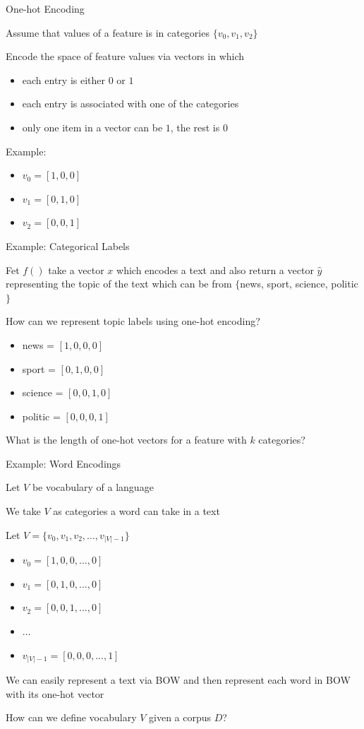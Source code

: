 \documentclass[12pt, handout]{beamer}
\begin{document}
\begin{frame}{One-hot Encoding}  

Assume that values of a feature is in categories $\{ v_0, v_1, v_2 \}$

Encode the space of feature values via vectors in which 

		\begin{itemize}
			\item each entry is either $0$ or $1$
			\item each entry is associated with one of the categories
			\item only one item in a vector can be $1$, the rest is $0$
		\end{itemize}

Example:
		\begin{itemize}
			\item $v_0 = [1, 0, 0]$
			\item $v_1 = [0, 1, 0]$
			\item $v_2 = [0, 0, 1]$
		\end{itemize}
\end{frame}
\begin{frame}{Example: Categorical Labels}

Fet $f()$ take a vector $x$ which encodes a text and also return a vector $\hat{y}$ representing the topic of the text which can be from $\{$news, sport, science, politic$\}$

How can we represent topic labels using one-hot encoding? 

		\begin{itemize}
			\item news = $[1,0,0,0]$
			\item sport = $[0,1,0,0]$
			\item science = $[0,0,1,0]$
			\item politic = $[0,0,0,1]$
		\end{itemize}
		
What is the length of one-hot vectors for a feature with $k$ categories?  
		

\end{frame}
\begin{frame}{Example: Word Encodings}

Let $V$ be vocabulary of a language 

We take $V$ as categories a word can take in a text

Let $V= \{v_0, v_1, v_2,...,v_{|V|-1} \}$
		\begin{itemize}
			\item $v_0 = [1,0,0,..., 0]$
			\item $v_1 = [0,1,0,..., 0]$
			\item $v_2 = [0,0,1,..., 0]$
			\item $\ldots$
			\item $v_{|V|-1} = [0,0,0,..., 1]$
		\end{itemize}

We can easily represent a text via BOW and then represent each word in BOW with its one-hot vector

How can we define vocabulary $V$ given a corpus $D$?

\end{frame}
\end{document}
